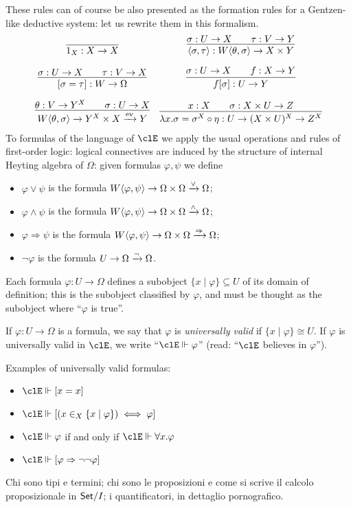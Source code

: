 \documentclass{amsart}
\def\la{\langle}
\def\ra{\rangle}
\def\lr#1#2{\la #1,#2\ra}
\begin{document}
These rules can of course be also presented as the formation rules for a Gentzen-like deductive system: let us rewrite them in this formalism.
\[ \begin{array}{cc}
    \infer{1_X : X \to X}{}                                                              &
    \infer{\lr{\sigma}{\tau} : W\lr{\theta}{\sigma} \to X \times Y }{\sigma : U \to X    &   & \tau : V \to Y}             \\[1em]
    \infer{[\sigma=\tau] : W \to \Omega}{\sigma : U \to X                                &   & \tau : V \to X}           &
    \infer{f[\sigma] : U \to Y}{\sigma : U \to X                                         &   & f : X \to Y}                \\[1em]
    \infer{W\lr{\theta}{\sigma} \xto{}Y^X\times X \xto{\text{ev}} Y}{\theta :  V \to Y^X &   & \sigma : U\to X}          &
    \infer{\lambda x.\sigma = \sigma^X\circ\eta : U \to (X\times U)^X \to Z^X}{ x: X     &   & \sigma : X\times U \to Z}
  \end{array}\]
To formulas of the language of $\clE$ we apply the usual operations and rules of first-order logic: logical connectives are induced by the structure of internal Heyting algebra of $\Omega$: given formulas $\varphi,\psi$ we define
\begin{itemize}
  \item $\varphi\lor \psi$ is the formula $W\lr{\varphi}{\psi} \to \Omega\times \Omega \xto{\lor} \Omega$;
  \item $\varphi\land\psi$ is the formula $W\lr{\varphi}{\psi} \to \Omega\times \Omega \xto{\land} \Omega$;
  \item $\varphi\Rightarrow\psi$ is the formula $W\lr{\varphi}{\psi} \to \Omega\times \Omega \xto{\Rightarrow} \Omega$;
  \item $\lnot\varphi$ is the formula $U \to \Omega \xrightarrow{\lnot} \Omega$.
\end{itemize}
Each formula $\varphi : U \to \Omega$ defines a subobject $\{x\mid \varphi\} \subseteq U$ of its domain of definition; this is the subobject classified by $\varphi$, and must be thought as the subobject where ``$\varphi$ is true''.

If $\varphi : U\to\Omega$ is a formula, we say that $\varphi$ is \emph{universally valid} if $\{x\mid\varphi\}\cong U$. If $\varphi$ is universally valid in $\clE$, we write ``$\clE\Vdash \varphi$'' (read: ``$\clE$ believes in $\varphi$'').

Examples of universally valid formulas:
\begin{itemize}
  \item $\clE\Vdash [x=x]$
  \item $\clE\Vdash [(x \in_X \{x\mid\varphi\}) \iff \varphi]$
  \item $\clE\Vdash \varphi$ if and only if $\clE \Vdash \forall x.\varphi$
  \item $\clE\Vdash [\varphi \Rightarrow \lnot\lnot\varphi]$
\end{itemize}
Chi sono tipi e termini; chi sono le proposizioni e come si scrive il calcolo proposizionale in $\mathsf{Set}/I$; i quantificatori, in dettaglio pornografico.
\end{document}
